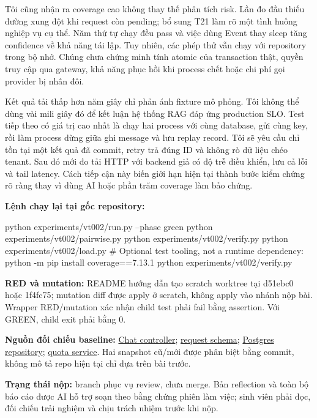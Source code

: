 \documentclass[11pt,a4paper]{article}
\newcommand{\Repo}{https://github.com/doandinhlinh25/thanh-tam-tam-linh}
\newcommand{\Base}{8aaceec1c4d4958e69536c622ad78dc58825ad29}
\begin{document}
Tôi cũng nhận ra coverage cao không thay thế phân tích risk. Lần đo đầu thiếu đường xung đột khi request còn pending; bổ sung T21 làm rõ một tình huống nghiệp vụ cụ thể. Năm thứ tự chạy đều pass và việc dùng Event thay sleep tăng confidence về khả năng tái lập. Tuy nhiên, các phép thử vẫn chạy với repository trong bộ nhớ. Chúng chưa chứng minh tính atomic của transaction thật, quyền truy cập qua gateway, khả năng phục hồi khi process chết hoặc chi phí gọi provider bị nhân đôi.

Kết quả tải thấp hơn năm giây chỉ phản ánh fixture mô phỏng. Tôi không thể dùng vài mili giây đó để kết luận hệ thống RAG đáp ứng production SLO. Test tiếp theo có giá trị cao nhất là chạy hai process với cùng database, gửi cùng key, rồi làm process dừng giữa ghi message và lưu replay record. Tôi sẽ yêu cầu chỉ tồn tại một kết quả đã commit, retry trả đúng ID và không rò dữ liệu chéo tenant. Sau đó mới đo tải HTTP với backend giả có độ trễ điều khiển, lưu cả lỗi và tail latency. Cách tiếp cận này biến giới hạn hiện tại thành bước kiểm chứng rõ ràng thay vì dùng AI hoặc phần trăm coverage làm bảo chứng.

\textbf{Lệnh chạy lại tại gốc repository:}
\begin{Code}
python experiments/vt002/run.py --phase green
python experiments/vt002/pairwise.py
python experiments/vt002/verify.py
python experiments/vt002/load.py
# Optional test tooling, not a runtime dependency:
python -m pip install coverage==7.13.1
python experiments/vt002/verify.py
\end{Code}
\textbf{RED và mutation:} README hướng dẫn tạo scratch worktree tại d51ebc0 hoặc 1f4fc75; mutation diff được apply ở scratch, không apply vào nhánh nộp bài. Wrapper RED/mutation xác nhận child test phải fail bằng assertion. Với GREEN, child exit phải bằng 0.

\textbf{Nguồn đối chiếu baseline:} \href{\Repo/blob/\Base/services/chat-service/app/api/controllers/chat_controller.py}{Chat controller}; \href{\Repo/blob/\Base/services/chat-service/app/schemas/chat/request.py}{request schema}; \href{\Repo/blob/\Base/services/chat-service/app/repositories/postgres/message_repository.py}{Postgres repository}; \href{\Repo/blob/\Base/services/tenant-service/services/quota.service.ts}{quota service}. Hai snapshot cũ/mới được phân biệt bằng commit, không mô tả repo hiện tại chỉ dựa trên bài trước.

\textbf{Trạng thái nộp:} branch phục vụ review, chưa merge. Bản reflection và toàn bộ báo cáo được AI hỗ trợ soạn theo bằng chứng phiên làm việc; sinh viên phải đọc, đối chiếu trải nghiệm và chịu trách nhiệm trước khi nộp.
\end{document}
